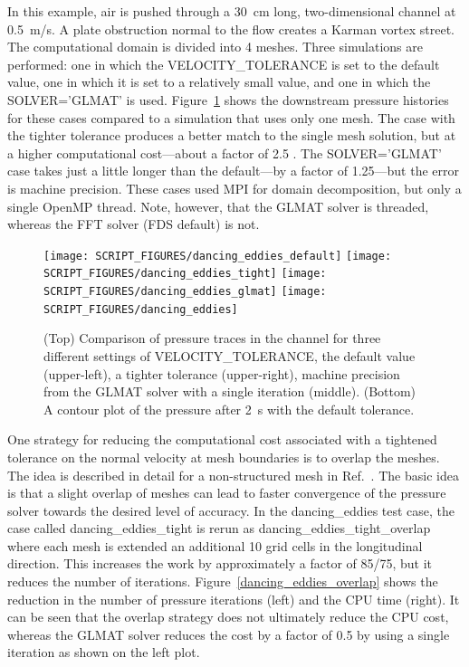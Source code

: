 \documentclass[11pt]{book}
\begin{document}
In this example, air is pushed through a 30~cm long, two-dimensional channel at 0.5~m/s. A plate obstruction normal to the flow creates a Karman vortex street. The computational domain is divided into 4 meshes. Three simulations are performed: one in which the {\ct VELOCITY\_TOLERANCE} is set to the default value, one in which it is set to a relatively small value, and one in which the {\ct SOLVER='GLMAT'} is used. Figure~\ref{dancing_eddies} shows the downstream pressure histories for these cases compared to a simulation that uses only one mesh. The case with the tighter tolerance produces a better match to the single mesh solution, but at a higher computational cost---about a factor of 2.5 .  The {\ct SOLVER='GLMAT'} case takes just a little longer than the default---by a factor of 1.25---but the error is machine precision.  These cases used MPI for domain decomposition, but only a single OpenMP thread.  Note, however, that the GLMAT solver is threaded, whereas the FFT solver (FDS default) is not.

\begin{figure}[ht]
\begin{center}
\texttt{[image: SCRIPT\_FIGURES/dancing\_eddies\_default]}
\texttt{[image: SCRIPT\_FIGURES/dancing\_eddies\_tight]}
\texttt{[image: SCRIPT\_FIGURES/dancing\_eddies\_glmat]}
\texttt{[image: SCRIPT\_FIGURES/dancing\_eddies]}
\end{center}
\caption[Results of the {\ct dancing\_eddies} test cases]{(Top) Comparison of pressure traces in the channel for three different settings of {\ct VELOCITY\_TOLERANCE}, the default value (upper-left), a tighter tolerance (upper-right), machine precision from the GLMAT solver with a single iteration (middle). (Bottom) A contour plot of the pressure after 2~s with the default tolerance.}
\label{dancing_eddies}
\end{figure}

One strategy for reducing the computational cost associated with a tightened tolerance on the normal velocity at mesh boundaries is to overlap the meshes. The idea is described in detail for a non-structured mesh in Ref.~\cite{Grinberg:JCP2010}. The basic idea is that a slight overlap of meshes can lead to faster convergence of the pressure solver towards the desired level of accuracy. In the {\ct dancing\_eddies} test case, the case called {\ct dancing\_eddies\_tight} is rerun as {\ct dancing\_eddies\_tight\_overlap} where each mesh is extended an additional 10 grid cells in the longitudinal direction. This increases the work by approximately a factor of 85/75, but it reduces the number of iterations. Figure~\ref{dancing_eddies_overlap} shows the reduction in the number of pressure iterations (left) and the CPU time (right).  It can be seen that the overlap strategy does not ultimately reduce the CPU cost, whereas the GLMAT solver reduces the cost by a factor of 0.5 by using a single iteration as shown on the left plot.
\end{document}
